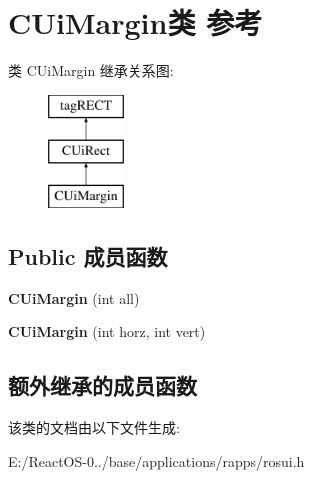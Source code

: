 \hypertarget{class_c_ui_margin}{}\section{C\+Ui\+Margin类 参考}
\label{class_c_ui_margin}
类 C\+Ui\+Margin 继承关系图\+:\begin{figure}[H]
\begin{center}
\leavevmode
\includegraphics[height=3.000000cm]{class_c_ui_margin}
\end{center}
\end{figure}
\subsection*{Public 成员函数}
\begin{DoxyCompactItemize}
\item 
\mbox{\label{class_c_ui_margin_af2478fc83ce7cb2e8f723212bdd1e0b0}} 
{\bfseries C\+Ui\+Margin} (int all)
\item 
\mbox{\label{class_c_ui_margin_af601c0ea8dfc1862472490bfffa64d63}} 
{\bfseries C\+Ui\+Margin} (int horz, int vert)
\end{DoxyCompactItemize}
\subsection*{额外继承的成员函数}


该类的文档由以下文件生成\+:\begin{DoxyCompactItemize}
\item 
E\+:/\+React\+O\+S-\/0../base/applications/rapps/rosui.\+h\end{DoxyCompactItemize}
